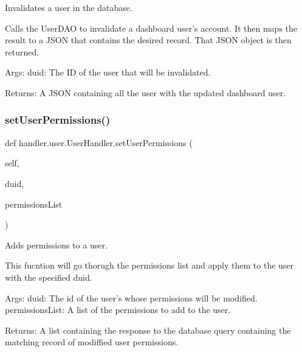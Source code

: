 \begin{DoxyVerb}Invalidates a user in the database.

Calls the UserDAO to invalidate a dashboard user's account. It then
maps the result to a JSON that contains the desired record. That JSON 
object is then returned.

Args:
    duid: The ID of the user that will be invalidated.

Returns:
    A JSON containing all the user with the updated dashboard user.
\end{DoxyVerb}
 \mbox{\label{classhandler_1_1user_1_1_user_handler_a0c8766b4b476bc123a2306aeccd2b52c}} 
\subsubsection{\texorpdfstring{set\+User\+Permissions()}{setUserPermissions()}}
{\footnotesize\ttfamily def handler.\+user.\+User\+Handler.\+set\+User\+Permissions (\begin{DoxyParamCaption}\item[{}]{self,  }\item[{}]{duid,  }\item[{}]{permissions\+List }\end{DoxyParamCaption})}

\begin{DoxyVerb}Adds permissions to a user.

This fucntion will go thorugh the permissions list and apply them to 
the user with the specified duid.

Args:
    duid: The id of the user's whose permissions will be modified.
    permissionsList: A list of the permissions to add to the user.

Returns:
    A list containing the response to the database query containing 
    the matching record of modiffied user permissions.
\end{DoxyVerb}
 \mbox{\label{classhandler_1_1user_1_1_user_handler_aa98936c6961b8de393b8fd3f76882170}} 
